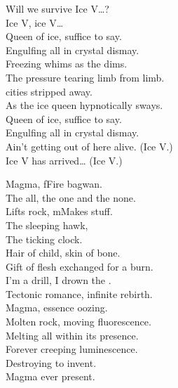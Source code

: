 Will we survive Ice V…? \\

Ice V, ice V… \\

Queen of ice, suffice to say. \\
Engulfing all in crystal dismay. \\
Freezing whims as the  dims. \\
The pressure tearing limb from limb. \\

 cities stripped away. \\
As the ice queen hypnotically sways. \\
Queen of ice, suffice to say. \\
Engulfing all in crystal dismay. \\

Ain't getting out of here alive. (Ice V.) \\
Ice V has arrived… (Ice V.) \\





Magma, fFire bagwan. \\
The all, the one and the none. \\
Lifts rock, mMakes stuff. \\
The sleeping hawk, \\
The ticking clock. \\

Hair of child, skin of bone. \\
Gift of flesh exchanged for a burn. \\
I'm a drill, I drown the . \\
Tectonic romance, infinite rebirth. \\

Magma, essence oozing. \\
Molten rock, moving fluorescence. \\
Melting all within its presence. \\
Forever creeping luminescence. \\
Destroying to invent. \\
Magma  ever present. \\

